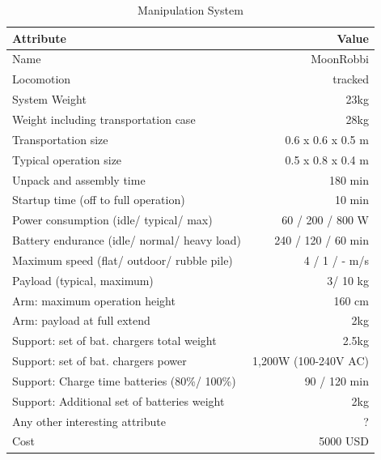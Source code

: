 \documentclass[journal]{IEEEtran}
\begin{document}
\begin{table}
\renewcommand{\arraystretch}{1}
 \tabcolsep=0.1cm
\caption{Manipulation System}
\label{tab:SystemRobot1}
\centering
\begin{tabular}{|l|r|}
\hline
Attribute & Value \\ \hline
Name & MoonRobbi \\
Locomotion & tracked \\
System Weight & 23kg \\
Weight including transportation case & 28kg \\
Transportation size & 0.6 x 0.6 x 0.5 m \\
Typical operation size & 0.5 x 0.8  x 0.4 m \\
Unpack and assembly time & 180 min \\
Startup time (off to full operation) & 10 min \\
Power consumption (idle/ typical/ max) & 60 / 200 / 800 W \\
Battery endurance (idle/ normal/ heavy load) & 240 / 120 / 60 min\\
Maximum speed (flat/ outdoor/ rubble pile) & 4 / 1 / - m/s\\
Payload (typical, maximum) & 3/ 10 kg\\
Arm: maximum operation height & 160 cm \\
Arm: payload at full extend & 2kg\\
Support: set of bat. chargers total weight & 2.5kg\\
Support: set of bat. chargers power & 1,200W (100-240V AC)\\
Support: Charge time batteries (80\%/ 100\%) & 90 / 120 min\\
Support: Additional set of batteries weight & 2kg\\
Any other interesting attribute & ?\\
Cost & 5000 USD \\
\hline
\end{tabular}
\end{table}
\end{document}
